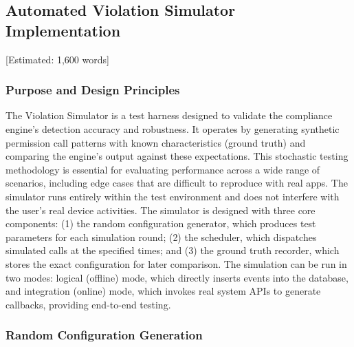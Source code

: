 \subsection{Automated Violation Simulator Implementation} [Estimated: 1,600 words]

\subsubsection{Purpose and Design Principles}

The Violation Simulator is a test harness designed to validate the compliance engine's detection accuracy and robustness. It operates by generating synthetic permission call patterns with known characteristics (ground truth) and comparing the engine's output against these expectations. This stochastic testing methodology is essential for evaluating performance across a wide range of scenarios, including edge cases that are difficult to reproduce with real apps. The simulator runs entirely within the test environment and does not interfere with the user's real device activities. The simulator is designed with three core components: (1) the random configuration generator, which produces test parameters for each simulation round; (2) the scheduler, which dispatches simulated calls at the specified times; and (3) the ground truth recorder, which stores the exact configuration for later comparison. The simulation can be run in two modes: logical (offline) mode, which directly inserts events into the database, and integration (online) mode, which invokes real system APIs to generate callbacks, providing end-to-end testing.

\subsubsection{Random Configuration Generation}

